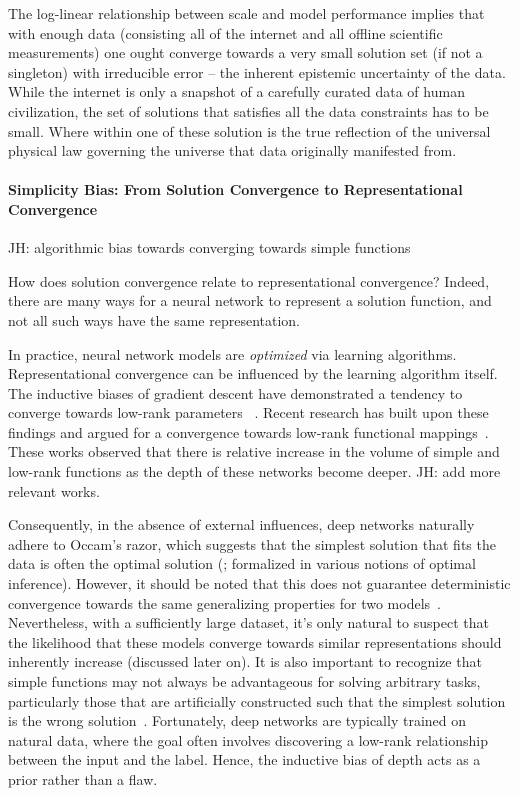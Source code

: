 \documentclass{article}
\newcommand{\jh}[1]{{\;\color{red}JH: #1}}
\theoremstyle{plain}
\theoremstyle{definition}
\theoremstyle{remark}
\begin{document}
The log-linear relationship between scale and model performance implies that with enough data (consisting all of the internet and all offline scientific measurements) one ought converge towards a very small solution set (if not a singleton) with irreducible error -- the inherent epistemic uncertainty of the data. While the internet is only a snapshot of a carefully curated data of human civilization, the set of solutions that satisfies all the data constraints has to be small. Where within one of these solution is the true reflection of the universal physical law governing the universe that data originally manifested from. 


\paragraph{Simplicity Bias: From Solution Convergence to Representational Convergence}
\jh{algorithmic bias towards converging towards simple functions}


How does solution convergence relate to representational convergence? Indeed, there are many ways for a neural network to represent a solution function, and not all such ways have the same representation. 

In practice, neural network models are \emph{optimized} via learning algorithms. Representational convergence can be influenced by the learning algorithm itself. The inductive biases of gradient descent have demonstrated a tendency to converge towards low-rank parameters ~\cite{gunasekar2018implicit,arora2019implicit}.
Recent research has built upon these findings and argued for a convergence towards low-rank functional mappings~\cite{valle2018deep, huh2023simplicitybias,dingle2018input}. These works observed that there is relative increase in the volume of simple and low-rank functions as the depth of these networks become deeper. \jh{add more relevant works}. 

Consequently, in the absence of external influences, deep networks naturally adhere to Occam's razor, which suggests that the simplest solution that fits the data is often the optimal solution (\cite{solomonoff1964formal}; formalized in various notions of optimal inference). However, it should be noted that this does not guarantee deterministic convergence towards the same generalizing properties for two models~\cite{liu2020bad}. Nevertheless, with a sufficiently large dataset, it's only natural to suspect that the likelihood that these models converge towards similar representations should inherently increase (discussed later on). It is also important to recognize that simple functions may not always be advantageous for solving arbitrary tasks, particularly those that are artificially constructed such that the simplest solution is the wrong solution~\cite{shah2020pitfalls}. Fortunately, deep networks are typically trained on natural data, where the goal often involves discovering a low-rank relationship between the input and the label. Hence, the inductive bias of depth acts as a prior rather than a flaw.
\end{document}
